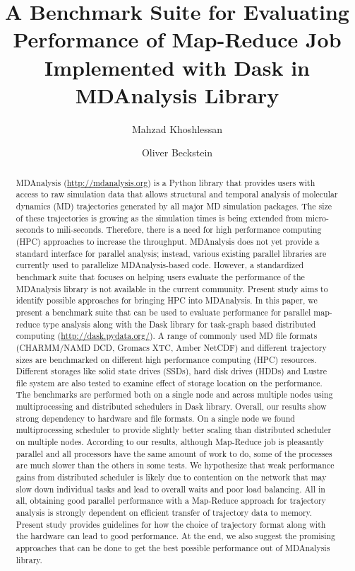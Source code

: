 \documentclass[11pt,letterpaper]{scrartcl}
\title{A Benchmark Suite for Evaluating Performance of Map-Reduce Job Implemented with Dask in MDAnalysis Library}
\author{Mahzad Khoshlessan \and Oliver Beckstein}
\begin{document}
\sloppy

\maketitle

\begin{abstract}
MDAnalysis (\url{http://mdanalysis.org}) is a Python library that provides users with access to raw simulation data that allows structural and temporal analysis of molecular dynamics (MD) trajectories generated by all major MD simulation packages. 
The size of these trajectories is growing as the simulation times is being extended from micro-seconds to mili-seconds. 
Therefore, there is a need for high performance computing (HPC) approaches to increase the throughput. 
MDAnalysis does not yet provide a standard interface for parallel analysis; instead, various existing parallel libraries are currently used to parallelize MDAnalysis-based code. 
However, a standardized benchmark suite that focuses on helping users evaluate the performance of the MDAnalysis library is not available in the current community. 
Present study aims to identify possible approaches for bringing HPC into MDAnalysis. 
In this paper, we present a benchmark suite that can be used to evaluate performance for parallel map-reduce type analysis along with the Dask library for task-graph based distributed computing (\url{http://dask.pydata.org/}). 
A range of commonly used MD file formats (CHARMM/NAMD DCD, Gromacs XTC, Amber NetCDF) and different trajectory sizes are benchmarked on different high performance computing (HPC) resources. 
Different storages like solid state drives (SSDs), hard disk drives (HDDs) and Lustre file system are also tested to examine effect of storage location on the performance. 
The benchmarks are performed both on a single node and across multiple nodes using multiprocessing and distributed schedulers in Dask library.
Overall, our results show strong dependency to hardware and file formats. 
On a single node we found multiprocessing scheduler to provide slightly better scaling than distributed scheduler on multiple nodes.
According to our results, although Map-Reduce job is pleasantly parallel and all processors have the same amount of work to do, some of the processes are much slower than the others in some tests.
We hypothesize that weak performance gains from distributed scheduler is likely due to contention on the network that may slow down individual tasks and lead to overall waits and poor load balancing. 
All in all, obtaining good parallel performance with a Map-Reduce approach for trajectory analysis is strongly dependent on efficient transfer of trajectory data to memory. 
Present study provides guidelines for how the choice of trajectory format along with the hardware can lead to good performance.
At the end, we also suggest the promising approaches that can be done to get the best possible performance out of MDAnalysis library.
\end{abstract}



\appendix
\end{document}
